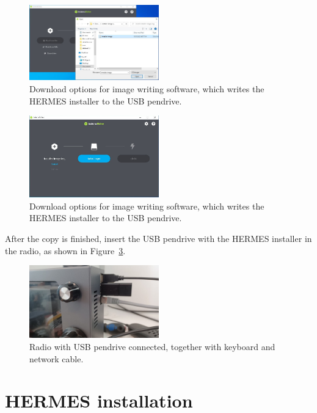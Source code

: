 \documentclass[11pt,a4paper]{article}
\begin{document}
\begin{figure}[H]
  \centering
  \includegraphics[width=0.5\textwidth]{pictures/balena-3-ed.jpg}
  \caption{Download options for image writing software, which writes the HERMES installer to the USB pendrive.}
  \label{fig:balena3}
\end{figure}

\begin{figure}[H]
  \centering
  \includegraphics[width=0.5\textwidth]{pictures/balena-4-ed.jpg}
  \caption{Download options for image writing software, which writes the HERMES installer to the USB pendrive.}
  \label{fig:balena4}
\end{figure}

After the copy is finished, insert the USB pendrive with the HERMES installer in the radio, as shown in Figure~\ref{fig:pen1}.

\begin{figure}[H]
  \centering
  \includegraphics[width=0.5\textwidth]{pictures/usb-1.jpeg}
  \caption{Radio with USB pendrive connected, together with keyboard and network cable.}
  \label{fig:pen1}
\end{figure}


\section{HERMES installation}
\end{document}
